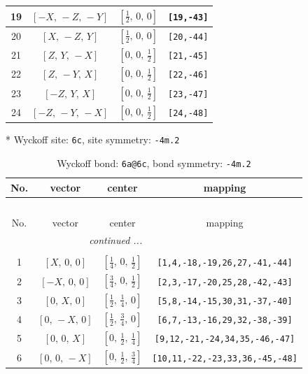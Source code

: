 \documentclass[fleqn,8pt]{jsarticle}
\begin{document}
\begin{longtable}{cccc}
19 & $\left[ - X,\, - Z,\, - Y \right]$ & $\left[ \frac{1}{2},\, 0,\, 0 \right]$ & {\tt [19,-43]} \\ \hline
20 & $\left[ X,\, - Z,\, Y \right]$ & $\left[ \frac{1}{2},\, 0,\, 0 \right]$ & {\tt [20,-44]} \\ \hline
21 & $\left[ Z,\, Y,\, - X \right]$ & $\left[ 0,\, 0,\, \frac{1}{2} \right]$ & {\tt [21,-45]} \\ \hline
22 & $\left[ Z,\, - Y,\, X \right]$ & $\left[ 0,\, 0,\, \frac{1}{2} \right]$ & {\tt [22,-46]} \\ \hline
23 & $\left[ - Z,\, Y,\, X \right]$ & $\left[ 0,\, 0,\, \frac{1}{2} \right]$ & {\tt [23,-47]} \\ \hline
24 & $\left[ - Z,\, - Y,\, - X \right]$ & $\left[ 0,\, 0,\, \frac{1}{2} \right]$ & {\tt [24,-48]} \\
\end{longtable}
* Wyckoff site: {\tt 6c}, site symmetry: {\tt -4m.2}
\renewcommand{\arraystretch}{1.2}
\begin{longtable}{cccc}
\caption{Wyckoff bond: {\tt 6a@6c}, bond symmetry: {\tt -4m.2}}
 \\
 \hline \hline
No. & vector & center & mapping \\ \hline \endfirsthead

\multicolumn{3}{l}{\tablename\ \thetable{}} \\
 \hline \hline
No. & vector & center & mapping \\ \hline \endhead

 \hline \hline
\multicolumn{3}{r}{\footnotesize\it continued ...} \\ \endfoot

 \hline \hline
\multicolumn{3}{r}{} \\ \endlastfoot

1 & $\left[ X,\, 0,\, 0 \right]$ & $\left[ \frac{1}{4},\, 0,\, \frac{1}{2} \right]$ & {\tt [1,4,-18,-19,26,27,-41,-44]} \\ \hline
2 & $\left[ - X,\, 0,\, 0 \right]$ & $\left[ \frac{3}{4},\, 0,\, \frac{1}{2} \right]$ & {\tt [2,3,-17,-20,25,28,-42,-43]} \\ \hline
3 & $\left[ 0,\, X,\, 0 \right]$ & $\left[ \frac{1}{2},\, \frac{1}{4},\, 0 \right]$ & {\tt [5,8,-14,-15,30,31,-37,-40]} \\ \hline
4 & $\left[ 0,\, - X,\, 0 \right]$ & $\left[ \frac{1}{2},\, \frac{3}{4},\, 0 \right]$ & {\tt [6,7,-13,-16,29,32,-38,-39]} \\ \hline
5 & $\left[ 0,\, 0,\, X \right]$ & $\left[ 0,\, \frac{1}{2},\, \frac{1}{4} \right]$ & {\tt [9,12,-21,-24,34,35,-46,-47]} \\ \hline
6 & $\left[ 0,\, 0,\, - X \right]$ & $\left[ 0,\, \frac{1}{2},\, \frac{3}{4} \right]$ & {\tt [10,11,-22,-23,33,36,-45,-48]} \\
\end{longtable}
\end{document}
